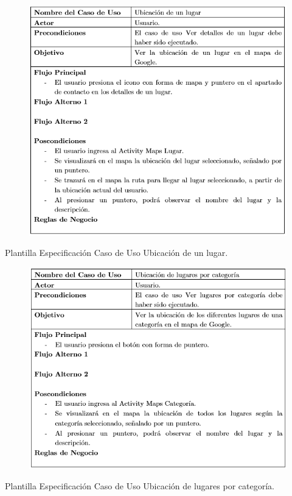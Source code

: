 \documentclass[12pt,letterpaper,openany]{book}
\begin{document}
\begin{table}[H]
\begin{center}
\begin{figure}[H]
\begin{center}
\includegraphics[width=13cm]{./imagenes/PCU/ubicacion_lugar}
\end{center}
\end{figure}
\end{center}
\caption{Plantilla Especificación Caso de Uso Ubicación de un lugar.}
\end{table}

\begin{table}[H]
\begin{center}
\begin{figure}[H]
\begin{center}
\includegraphics[width=13cm]{./imagenes/PCU/ubicacion_lugar_categoria}
\end{center}
\end{figure}
\end{center}
\caption{Plantilla Especificación Caso de Uso Ubicación de lugares por categoría.}
\end{table}
\end{document}
